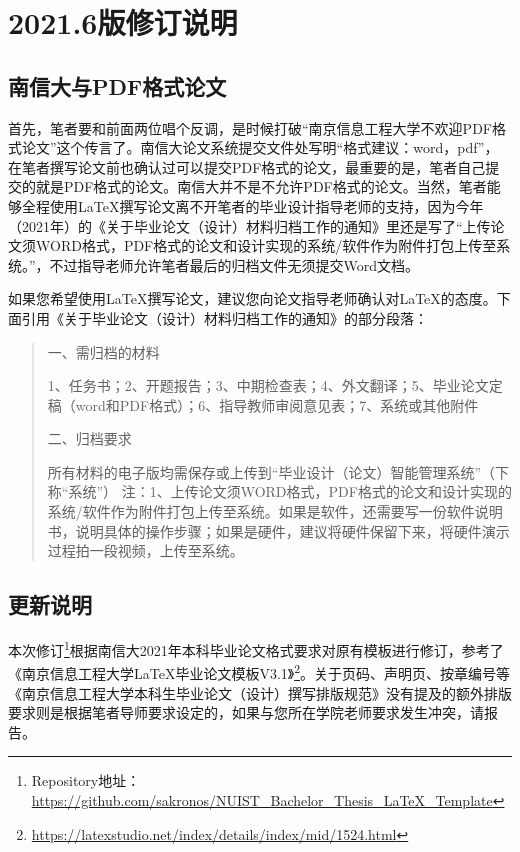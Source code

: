 \section{2021.6版修订说明}

\subsection{南信大与PDF格式论文}
首先，笔者要和前面两位唱个反调，是时候打破“南京信息工程大学不欢迎PDF格式论文”这个传言了。南信大论文系统提交文件处写明“格式建议：word，pdf”，在笔者撰写论文前也确认过可以提交PDF格式的论文，最重要的是，笔者自己提交的就是PDF格式的论文。南信大并不是不允许PDF格式的论文。当然，笔者能够全程使用\LaTeX 撰写论文离不开笔者的毕业设计指导老师的支持，因为今年（2021年）的《关于毕业论文（设计）材料归档工作的通知》里还是写了“上传论文须WORD格式，PDF格式的论文和设计实现的系统/软件作为附件打包上传至系统。”，不过指导老师允许笔者最后的归档文件无须提交Word文档。

如果您希望使用\LaTeX 撰写论文，建议您向论文指导老师确认对\LaTeX 的态度。下面引用《关于毕业论文（设计）材料归档工作的通知》的部分段落：
\begin{quote}
一、需归档的材料

1、任务书；2、开题报告；3、中期检查表；4、外文翻译；5、毕业论文定稿（word和PDF格式）；6、指导教师审阅意见表；7、系统或其他附件

二、归档要求

所有材料的电子版均需保存或上传到“毕业设计（论文）智能管理系统”（下称“系统”）
注：1、上传论文须WORD格式，PDF格式的论文和设计实现的系统/软件作为附件打包上传至系统。如果是软件，还需要写一份软件说明书，说明具体的操作步骤；如果是硬件，建议将硬件保留下来，将硬件演示过程拍一段视频，上传至系统。

\end{quote}

\subsection{更新说明}
本次修订\footnote{Repository地址：\url{https://github.com/sakronos/NUIST_Bachelor_Thesis_LaTeX_Template}}根据南信大2021年本科毕业论文格式要求对原有模板进行修订，参考了《南京信息工程大学LaTeX毕业论文模板V3.1》\footnote{\url{https://latexstudio.net/index/details/index/mid/1524.html}}。关于页码、声明页、按章编号等《南京信息工程大学本科生毕业论文（设计）撰写排版规范》没有提及的额外排版要求则是根据笔者导师要求设定的，如果与您所在学院老师要求发生冲突，请报告。

